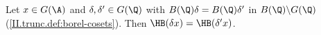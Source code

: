 Let $x\in G(\A)$ and $\delta,\delta'\in G(\Q)$ with $B(\Q)\delta=B(\Q)\delta'$ in $B(\Q)\backslash G(\Q)$ (\cref{II.trunc.def:borel-cosets}). Then
$\HB(\delta x)=\HB(\delta'x)$.
